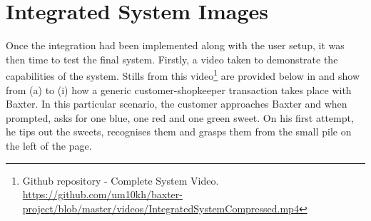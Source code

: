 \section{Integrated System Images}
Once the integration had been implemented along with the user setup, it was then time to test the final system. Firstly, a video taken to demonstrate the capabilities of the system. Stills from this video\footnote{Github repository - Complete System Video. \url{https://github.com/um10kh/baxter-project/blob/master/videos/IntegratedSystemCompressed.mp4}} are provided below in \textbf{} and show from (a) to (i) how a generic customer-shopkeeper transaction takes place with Baxter.\newline\newline
In this particular scenario, the customer approaches Baxter and when prompted, asks for one blue, one red and one green sweet. On his first attempt, he tips out the sweets, recognises them and grasps them from the small pile on the left of the page.
